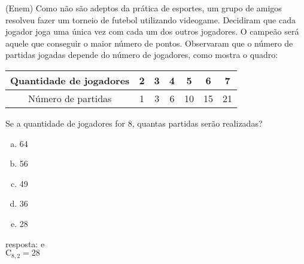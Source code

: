 \begin{ex}
  (Enem) Como não são adeptos da prática de esportes, um grupo de amigos resolveu fazer um torneio de futebol utilizando videogame. Decidiram que cada jogador joga uma única vez com cada um dos outros jogadores. O campeão será aquele que conseguir o maior número de pontos. Observaram que o número de partidas jogadas depende do número de jogadores, como mostra o quadro:
  \begin{center}
      \begin{tabular}{|c|c|c|c|c|c|c|} \hline
     Quantidade de jogadores & 2 & 3 & 4 & 5 & 6 & 7 \\ \hline
      Número de partidas & 1 & 3 & 6 & 10 & 15 & 21 \\ \hline 
      \end{tabular}
  \end{center}
  Se a quantidade de jogadores for 8, quantas partidas serão realizadas?
    \begin{enumerate} [(a)]
      \item 64
      \item 56
      \item 49
      \item 36
      \item 28
    \end{enumerate}
      \begin{sol}
       resposta: e \\
       $\mathrm{C}_{8,2}=28$
      \end{sol}
 \end{ex}